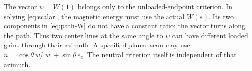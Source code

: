 The vector \(w=W(1)\) belongs only to the unloaded-endpoint criterion. In solving \eqref{eq:scalar}, the magnetic energy must use the actual \(W(s)\). Its two components in \eqref{eq:path-W} do not have a constant ratio: the vector turns along the path. Thus two center lines at the same angle to \(w\) can have different loaded gains through their azimuth. A specified planar scan may use \(n=\cos\theta\,w/|w|+\sin\theta\,e_z\). The neutral criterion itself is independent of that azimuth.
